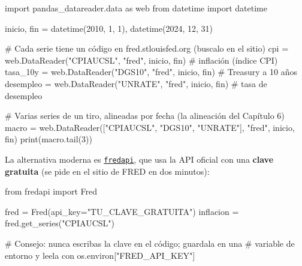 \documentclass[
  spanish,
  letterpaper,
  DIV=11,
  numbers=noendperiod]{scrreprt}
\newenvironment{Shaded}{\begin{snugshade}}{\end{snugshade}}
\newcommand{\BuiltInTok}[1]{\textcolor[rgb]{0.00,0.23,0.31}{#1}}
\newcommand{\CommentTok}[1]{\textcolor[rgb]{0.37,0.37,0.37}{#1}}
\newcommand{\DecValTok}[1]{\textcolor[rgb]{0.68,0.00,0.00}{#1}}
\newcommand{\ImportTok}[1]{\textcolor[rgb]{0.00,0.46,0.62}{#1}}
\newcommand{\NormalTok}[1]{\textcolor[rgb]{0.00,0.23,0.31}{#1}}
\newcommand{\OperatorTok}[1]{\textcolor[rgb]{0.37,0.37,0.37}{#1}}
\newcommand{\StringTok}[1]{\textcolor[rgb]{0.13,0.47,0.30}{#1}}
\begin{document}
\begin{Shaded}
\begin{Highlighting}[]
\ImportTok{import}\NormalTok{ pandas\_datareader.data }\ImportTok{as}\NormalTok{ web}
\ImportTok{from}\NormalTok{ datetime }\ImportTok{import}\NormalTok{ datetime}

\NormalTok{inicio, fin }\OperatorTok{=}\NormalTok{ datetime(}\DecValTok{2010}\NormalTok{, }\DecValTok{1}\NormalTok{, }\DecValTok{1}\NormalTok{), datetime(}\DecValTok{2024}\NormalTok{, }\DecValTok{12}\NormalTok{, }\DecValTok{31}\NormalTok{)}

\CommentTok{\# Cada serie tiene un código en fred.stlouisfed.org (buscalo en el sitio)}
\NormalTok{cpi }\OperatorTok{=}\NormalTok{ web.DataReader(}\StringTok{"CPIAUCSL"}\NormalTok{, }\StringTok{"fred"}\NormalTok{, inicio, fin)      }\CommentTok{\# inflación (índice CPI)}
\NormalTok{tasa\_10y }\OperatorTok{=}\NormalTok{ web.DataReader(}\StringTok{"DGS10"}\NormalTok{, }\StringTok{"fred"}\NormalTok{, inicio, fin)    }\CommentTok{\# Treasury a 10 años}
\NormalTok{desempleo }\OperatorTok{=}\NormalTok{ web.DataReader(}\StringTok{"UNRATE"}\NormalTok{, }\StringTok{"fred"}\NormalTok{, inicio, fin)  }\CommentTok{\# tasa de desempleo}

\CommentTok{\# Varias series de un tiro, alineadas por fecha (la alineación del Capítulo 6)}
\NormalTok{macro }\OperatorTok{=}\NormalTok{ web.DataReader([}\StringTok{"CPIAUCSL"}\NormalTok{, }\StringTok{"DGS10"}\NormalTok{, }\StringTok{"UNRATE"}\NormalTok{], }\StringTok{"fred"}\NormalTok{, inicio, fin)}
\BuiltInTok{print}\NormalTok{(macro.tail(}\DecValTok{3}\NormalTok{))}
\end{Highlighting}
\end{Shaded}

La alternativa moderna es
\href{https://github.com/mortada/fredapi}{\texttt{fredapi}}, que usa la
API oficial con una \textbf{clave gratuita} (se pide en el sitio de FRED
en dos minutos):

\begin{Shaded}
\begin{Highlighting}[]
\ImportTok{from}\NormalTok{ fredapi }\ImportTok{import}\NormalTok{ Fred}

\NormalTok{fred }\OperatorTok{=}\NormalTok{ Fred(api\_key}\OperatorTok{=}\StringTok{"TU\_CLAVE\_GRATUITA"}\NormalTok{)}
\NormalTok{inflacion }\OperatorTok{=}\NormalTok{ fred.get\_series(}\StringTok{"CPIAUCSL"}\NormalTok{)}

\CommentTok{\# Consejo: nunca escribas la clave en el código; guardala en una}
\CommentTok{\# variable de entorno y leela con os.environ["FRED\_API\_KEY"]}
\end{Highlighting}
\end{Shaded}
\end{document}
